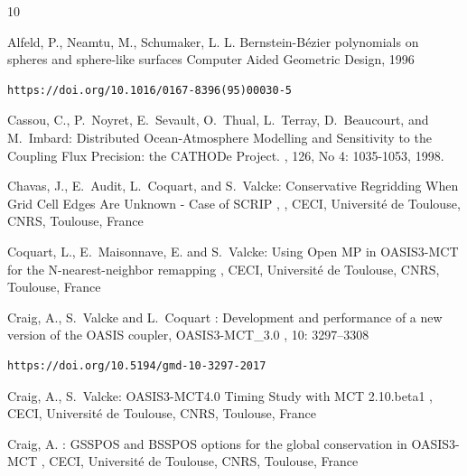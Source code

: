 \newpage
\begin{thebibliography}{10}
\vspace{-0.3cm}

Alfeld, P., Neamtu, M., Schumaker, L. L.
\newblock Bernstein-B\'ezier polynomials on spheres and sphere-like surfaces
\newblock Computer Aided Geometric Design, 1996
\newblock \begin{verbatim}https://doi.org/10.1016/0167-8396(95)00030-5\end{verbatim}

Cassou, C., P.~Noyret, E.~Sevault, O.~Thual, L.~Terray, D.~Beaucourt, and
  M.~Imbard:
\newblock Distributed Ocean-Atmosphere Modelling and Sensitivity to the
  Coupling Flux Precision: the CATHODe Project.
, 126, No 4: 1035-1053, 1998.

Chavas, J., E.~Audit, L.~Coquart, and S.~Valcke:
\newblock Conservative Regridding When Grid Cell Edges Are Unknown - Case of SCRIP
,
,
\newblock CECI, Universit\'e de Toulouse, CNRS, Toulouse, France

Coquart, L., E.~Maisonnave, E. and S.~Valcke:
\newblock Using Open MP in OASIS3-MCT for the N-nearest-neighbor remapping
,
\newblock CECI, Universit\'e de Toulouse, CNRS, Toulouse, France

Craig, A., S.~Valcke and L.~Coquart :
\newblock Development and performance of a new version of the OASIS coupler, OASIS3-MCT\_3.0
, 10: 3297--3308
\newblock  \begin{verbatim}https://doi.org/10.5194/gmd-10-3297-2017\end{verbatim}

Craig, A., S.~Valcke:
\newblock OASIS3-MCT4.0 Timing Study with MCT 2.10.beta1
,
\newblock CECI, Universit\'e de Toulouse, CNRS, Toulouse, France

Craig, A. :
\newblock GSSPOS and BSSPOS options for the global conservation in OASIS3-MCT
,
\newblock CECI, Universit\'e de Toulouse, CNRS, Toulouse, France


\end{thebibliography}
